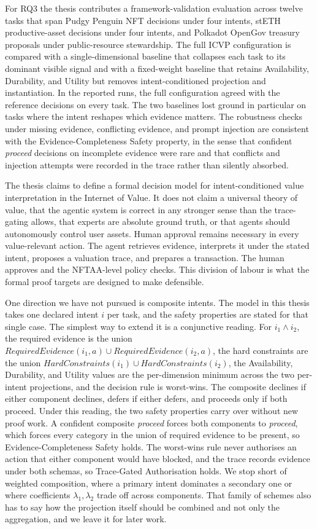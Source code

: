 For RQ3 the thesis contributes a framework-validation evaluation across twelve tasks that span Pudgy Penguin NFT decisions under four intents, stETH productive-asset decisions under four intents, and Polkadot OpenGov treasury proposals under public-resource stewardship. The full ICVP configuration is compared with a single-dimensional baseline that collapses each task to its dominant visible signal and with a fixed-weight baseline that retains Availability, Durability, and Utility but removes intent-conditioned projection and instantiation. In the reported runs, the full configuration agreed with the reference decisions on every task. The two baselines lost ground in particular on tasks where the intent reshapes which evidence matters. The robustness checks under missing evidence, conflicting evidence, and prompt injection are consistent with the Evidence-Completeness Safety property, in the sense that confident \textit{proceed} decisions on incomplete evidence were rare and that conflicts and injection attempts were recorded in the trace rather than silently absorbed.

The thesis claims to define a formal decision model for intent-conditioned value interpretation in the Internet of Value. It does not claim a universal theory of value, that the agentic system is correct in any stronger sense than the trace-gating allows, that experts are absolute ground truth, or that agents should autonomously control user assets. Human approval remains necessary in every value-relevant action. The agent retrieves evidence, interprets it under the stated intent, proposes a valuation trace, and prepares a transaction. The human approves and the NFTAA-level policy checks. This division of labour is what the formal proof targets are designed to make defensible.

One direction we have not pursued is composite intents. The model in this thesis takes one declared intent $i$ per task, and the safety properties are stated for that single case. The simplest way to extend it is a conjunctive reading. For $i_1 \land i_2$, the required evidence is the union $\textit{RequiredEvidence}(i_1, a) \cup \textit{RequiredEvidence}(i_2, a)$, the hard constraints are the union $\textit{HardConstraints}(i_1) \cup \textit{HardConstraints}(i_2)$, the Availability, Durability, and Utility values are the per-dimension minimum across the two per-intent projections, and the decision rule is worst-wins. The composite declines if either component declines, defers if either defers, and proceeds only if both proceed. Under this reading, the two safety properties carry over without new proof work. A confident composite \textit{proceed} forces both components to \textit{proceed}, which forces every category in the union of required evidence to be present, so Evidence-Completeness Safety holds. The worst-wins rule never authorises an action that either component would have blocked, and the trace records evidence under both schemas, so Trace-Gated Authorisation holds. We stop short of weighted composition, where a primary intent dominates a secondary one or where coefficients $\lambda_1, \lambda_2$ trade off across components. That family of schemes also has to say how the projection itself should be combined and not only the aggregation, and we leave it for later work.

